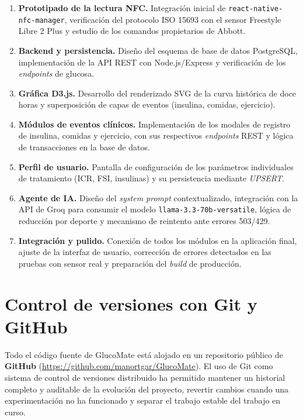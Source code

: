 \begin{enumerate}
    \item \textbf{Prototipado de la lectura NFC.} Integración inicial de
          \texttt{react-native-nfc-manager}, verificación del protocolo ISO 15693 con el
          sensor Freestyle Libre 2 Plus y estudio de los comandos propietarios de Abbott.
    \item \textbf{Backend y persistencia.} Diseño del esquema de base de datos PostgreSQL,
          implementación de la API REST con Node.js/Express y verificación de los
          \textit{endpoints} de glucosa.
    \item \textbf{Gráfica D3.js.} Desarrollo del renderizado SVG de la curva histórica de
          doce horas y superposición de capas de eventos (insulina, comidas, ejercicio).
    \item \textbf{Módulos de eventos clínicos.} Implementación de los modales de registro
          de insulina, comidas y ejercicio, con sus respectivos \textit{endpoints} REST
          y lógica de transacciones en la base de datos.
    \item \textbf{Perfil de usuario.} Pantalla de configuración de los parámetros
          individuales de tratamiento (ICR, FSI, insulinas) y su persistencia mediante
          \textit{UPSERT}.
    \item \textbf{Agente de IA.} Diseño del \textit{system prompt} contextualizado,
          integración con la API de Groq para consumir el modelo
          \texttt{llama-3.3-70b-versatile}, lógica de reducción por deporte
          y mecanismo de reintento ante errores 503/429.
    \item \textbf{Integración y pulido.} Conexión de todos los módulos en la aplicación
          final, ajuste de la interfaz de usuario, corrección de errores detectados en
          las pruebas con sensor real y preparación del \textit{build} de producción.
\end{enumerate}

\section{Control de versiones con Git y GitHub}
\label{sec:git-workflow}

Todo el código fuente de GlucoMate está alojado en un repositorio público de
\textbf{GitHub} (\url{https://github.com/manortgar/GlucoMate}). El uso de Git como
sistema de control de versiones distribuido ha permitido mantener un historial completo
y auditable de la evolución del proyecto, revertir cambios cuando una experimentación
no ha funcionado y separar el trabajo estable del trabajo en curso.

